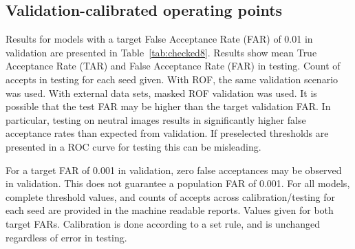 \documentclass[10pt,lettersize,journal]{IEEEtran}
\begin{document}
\subsection{Validation-calibrated operating points}
Results for models with a target False Acceptance Rate (FAR) of 0.01 in validation are presented in Table~\ref{tab:checked8}. Results show mean True Acceptance Rate (TAR) and False Acceptance Rate (FAR) in testing. Count of accepts in testing for each seed given. With ROF, the same validation scenario was used. With external data sets, masked ROF validation was used. It is possible that the test FAR may be higher than the target validation FAR. In particular, testing on neutral images results in significantly higher false acceptance rates than expected from validation. If preselected thresholds are presented in a ROC curve for testing this can be misleading.\par
For a target FAR of 0.001 in validation, zero false acceptances may be observed in validation. This does not guarantee a population FAR of 0.001. For all models, complete threshold values, and counts of accepts across calibration/testing for each seed are provided in the machine readable reports. Values given for both target FARs. Calibration is done according to a set rule, and is unchanged regardless of error in testing.\par
\begin{table}[t]\centering
\caption{Gate model with target FAR of 0.01 in validation. Averages from 3 seeds. Values for TA/FA indicate number of accepts in testing for each seed in turn. Thresholds from external datasets transferred from masked ROF validation.}
\label{tab:checked8}
\footnotesize\setlength{\tabcolsep}{2pt}
\ifdim\wd\uploadedtablebox>\columnwidth\resizebox{\columnwidth}{!}{\usebox{\uploadedtablebox}}\else\usebox{\uploadedtablebox}\fi
\end{table}
\end{document}
